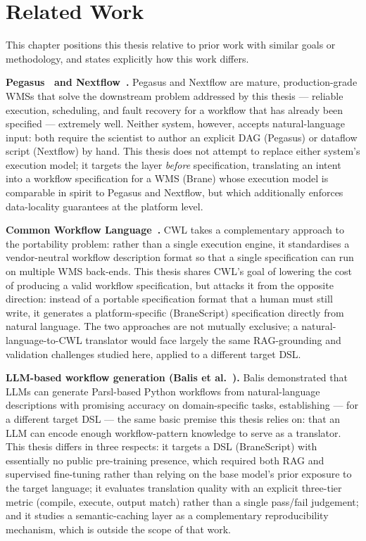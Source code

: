 \chapter{Related Work}\label{s:related}

This chapter positions this thesis relative to prior work with similar goals
or methodology, and states explicitly how this work differs.

\textbf{Pegasus~\cite{deelman2015pegasus} and Nextflow~\cite{di2017nextflow}.}
Pegasus and Nextflow are mature, production-grade WMSs that solve the
downstream problem addressed by this thesis --- reliable execution,
scheduling, and fault recovery for a workflow that has already been specified
--- extremely well. Neither system, however, accepts natural-language input:
both require the scientist to author an explicit DAG (Pegasus) or dataflow
script (Nextflow) by hand. This thesis does not attempt to replace either
system's execution model; it targets the layer \emph{before} specification,
translating an intent into a workflow specification for a WMS (Brane) whose
execution model is comparable in spirit to Pegasus and Nextflow, but which
additionally enforces data-locality guarantees at the platform level.

\textbf{Common Workflow Language~\cite{crusoe2022cwl}.} CWL takes a
complementary approach to the portability problem: rather than a single
execution engine, it standardises a vendor-neutral workflow description format
so that a single specification can run on multiple WMS back-ends. This thesis
shares CWL's goal of lowering the cost of producing a valid workflow
specification, but attacks it from the opposite direction: instead of a
portable specification format that a human must still write, it generates a
platform-specific (BraneScript) specification directly from natural language.
The two approaches are not mutually exclusive; a natural-language-to-CWL
translator would face largely the same RAG-grounding and validation challenges
studied here, applied to a different target DSL.

\textbf{LLM-based workflow generation (Balis et al.~\cite{balis2024llm}).}
Balis demonstrated that LLMs can generate Parsl-based Python workflows from
natural-language descriptions with promising accuracy on domain-specific
tasks, establishing --- for a different target DSL --- the same basic premise
this thesis relies on: that an LLM can encode enough workflow-pattern
knowledge to serve as a translator. This thesis differs in three respects:
it targets a DSL (BraneScript) with essentially no public pre-training
presence, which required both RAG and supervised fine-tuning rather than
relying on the base model's prior exposure to the target language; it
evaluates translation quality with an explicit three-tier metric (compile,
execute, output match) rather than a single pass/fail judgement; and it
studies a semantic-caching layer as a complementary reproducibility mechanism,
which is outside the scope of that work.


